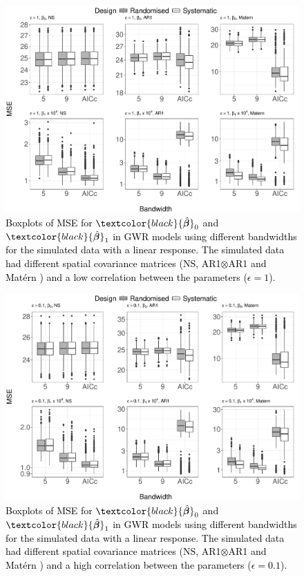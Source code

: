 \documentclass[a4paper]{article} 	%
\newcommand{\Matern}{Mat\'ern }
\newcommand{\zc}[1]{\textcolor{black}{#1}}
\begin{document}
\begin{figure}[!htp]
	\centering
	\includegraphics[width=\linewidth]{Col_LinCombMSE_newpar_1K_V4.pdf}
	\caption{\zc{Boxplots of MSE for $\zc{\hat{\bm{\beta}}}_0$ and $\zc{\hat{\bm{\beta}}}_1$ in GWR models using different bandwidths for the simulated data with a linear response. The simulated data had different spatial covariance matrices (NS, AR1$\otimes$AR1 and \Matern) and a low correlation between the parameters ($\epsilon=1$).}}\label{fig:LinBetaMSE}
\end{figure}


\begin{figure}[!thp]
	\centering
	\includegraphics[width=\linewidth]{Col_LinCombMSE_newpar_1K_eta01_V4.pdf}
	\caption{\zc{Boxplots of MSE for $\zc{\hat{\bm{\beta}}}_0$ and $\zc{\hat{\bm{\beta}}}_1$ in GWR models using different bandwidths for the simulated data with a linear response. The simulated data had different spatial covariance matrices (NS, AR1$\otimes$AR1 and \Matern) and a high correlation between the parameters ($\epsilon=0.1$).}}\label{fig:LinBetaMSEeta01}
\end{figure}
\end{document}
